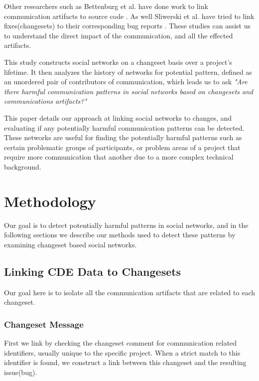 \documentclass[conference]{IEEEtran}
\begin{document}
Other researchers such as Bettenburg et al. have done work to link communication artifacts to source code \cite{Bettenburg:2008:ESI:1370750.1370757}.  As well Sliwerski et al. have tried to link fixes(changesets) to their corresponding bug reports \cite{Sliwerski:2005:CIF:1083142.1083147}.  These studies can assist us to understand the direct impact of the communication, and all the effected artifacts.  

This study constructs social networks on a changeset basis over a project's lifetime.  It then analyzes the history of networks for potential pattern, defined as an unordered pair of contributors of communication, which leads us to ask \textit{"Are there harmful communication patterns in social networks based on changesets and communications artifacts?"} 

This paper details our approach at linking social networks to changes, and evaluating if any potentially harmful communication patterns can be detected.  These networks are useful for finding the potentially harmful patterns such as certain problematic groups of participants, or problem areas of a project that require more communication that another due to a more complex technical background. 

\section{Methodology}
Our goal is to detect potentially harmful patterns in social networks, and in the following sections we describe our methods used to detect these patterns by examining changeset based social networks.

\subsection{Linking CDE Data to Changesets}
Our goal here is to isolate all the communication artifacts that are related to each changeset.  
\subsubsection{Changeset Message}
First we link by checking the changeset comment for communication related identifiers, usually unique to the specific project.  When a strict match to this identifier is found, we construct a link between this changeset and the resulting issue(bug).  
\end{document}
